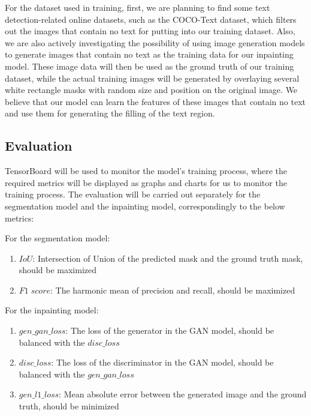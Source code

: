 \documentclass[10pt,twocolumn,letterpaper]{article}
\begin{document}
For the dataset used in training, first, we are planning to find some text detection-related online datasets, 
such as the COCO-Text dataset, which filters out the images that contain no text for putting into our training dataset. 
Also, we are also actively investigating the possibility of using image generation models to generate images that contain 
no text as the training data for our inpainting model. These image data will then be used as the ground truth of our training dataset, 
while the actual training images will be generated by overlaying several white rectangle masks with random size and position on the original image. 
We believe that our model can learn the features of these images that contain no text and use them for generating the filling of the text region.

\subsection{Evaluation}

TensorBoard will be used to monitor the model's training process, where the required metrics will be displayed as graphs and charts 
for us to monitor the training process. The evaluation will be carried out separately for the segmentation model and the inpainting 
model, correspondingly to the below metrics:

For the segmentation model:
\begin{enumerate}
    \item $IoU$: Intersection of Union of the predicted mask and the ground truth mask, should be maximized
    \item $F1\;score$: The harmonic mean of precision and recall, should be maximized
\end{enumerate}

For the inpainting model:
\begin{enumerate}
    \item $gen\_gan\_loss$: The loss of the generator in the GAN model, should be balanced with the $disc\_loss$
    \item $disc\_loss$: The loss of the discriminator in the GAN model, should be balanced with the $gen\_gan\_loss$
    \item $gen\_l1\_loss$: Mean absolute error between the generated image and the ground truth, should be minimized
\end{enumerate}
\end{document}
